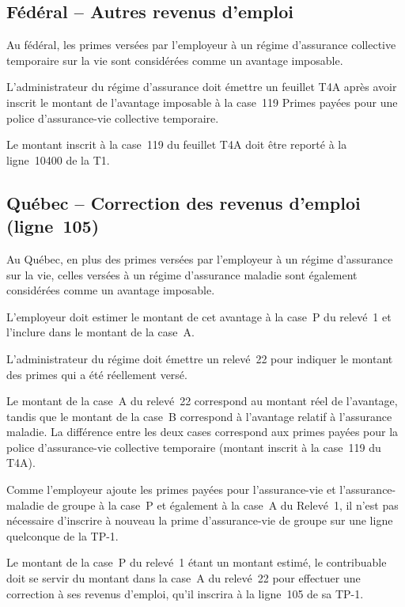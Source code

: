 \subsection{Fédéral – Autres revenus d'emploi}
Au fédéral, les primes versées par l'employeur à un régime d'assurance collective temporaire sur la vie sont considérées comme un avantage imposable.

L'administrateur du régime d'assurance doit émettre un feuillet T4A après avoir inscrit le montant de l'avantage imposable à la case~119 \og Primes payées pour une police d'assurance-vie collective temporaire\fg{}.

Le montant inscrit à la case~119 du feuillet T4A doit être reporté à la ligne~10400 de la T1.


\subsection{Québec – Correction des revenus d'emploi (ligne~105)}
Au Québec, en plus des primes versées par l'employeur à un régime d'assurance sur la vie, celles versées à un régime d'assurance maladie sont également considérées comme un avantage imposable.

L'employeur doit estimer le montant de cet avantage à la case~P du relevé~1 et l'inclure dans le montant de la case~A.

L'administrateur du régime doit émettre un relevé~22 pour indiquer le montant des primes qui a été réellement versé.


Le montant de la case~A du relevé~22 correspond au montant réel de l'avantage, tandis que le montant de la case~B correspond à l'avantage relatif à l'assurance maladie. La différence entre les deux cases correspond aux primes payées pour la police d'assurance-vie collective temporaire (montant inscrit à la case~119 du T4A).

\begin{note}
	Comme l'employeur ajoute les primes payées pour l'assurance-vie et l'assurance-maladie de groupe à la case~P et également à la case~A du Relevé~1, il n'est pas nécessaire d'inscrire à nouveau la prime d'assurance-vie de groupe sur une ligne quelconque de la TP-1.
\end{note}

Le montant de la case~P du relevé~1 étant un montant estimé, le contribuable doit se servir du montant dans la case~A du relevé~22 pour effectuer une correction à ses revenus d'emploi, qu'il inscrira à la ligne~105 de sa TP-1.

